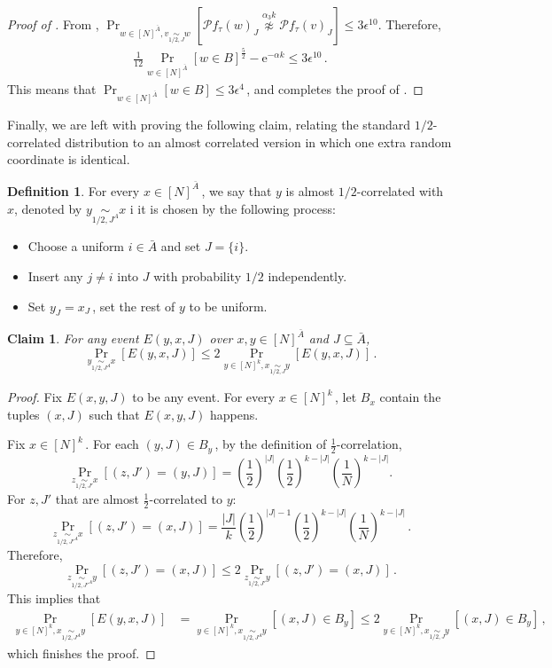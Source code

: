\documentclass[11pt]{article}
\numberwithin{equation}{section}
\newtheorem{claim}[theorem]{Claim}
\theoremstyle{definition}
\newtheorem{definition}[theorem]{Definition}
\theoremstyle{plain}
\newcommand{\eee}{\mathrm e}
\newcommand{\Prob}[2][]{\Pr_{{#1}}\left[#2\right]} %
\newcommand{\Paren}[1]{\left(#1\right)} %
\newcommand{\brac}[1]{[#1]} %
\newcommand{\set}[1]{\{#1\}} %
\newcommand\f{f} %
\newcommand\bh{\mathcal{P}\f_\tau} %
\newcommand\neqg[1]{\stackrel{{#1}}{ \not\approx}} %
\newcommand\cor[1]{\underset{\scriptscriptstyle#1}{\sim}} %
\newcommand\acor[1]{\underset{\scriptscriptstyle#1^A}{\sim}} %
\newcommand\rest[1]{{\bar{#1}}}  %
\begin{document}
\begin{proof}[Proof of ]
	From , $\Prob[{w\in\brac{N}^{\bar{A}},v\cor{1/2,J}{w}}]{\bh(w)_J\neqg{\alpha_3 k} \bh(v)_J}\leq 3\epsilon^{10}.$ Therefore,
	\begin{align}\label{eq:upper BC}
		\frac{1}{12}\Pr_{w\in[N]^{\bar{A}}}[w\in B]^\frac{5}{2} - \eee^{-\alpha k} \leq 3\epsilon^{10}\,. %
	\end{align}
	This means that $\Pr_{w\in[N]^{\bar{A}}}[w\in B] \leq 3\epsilon^4$\,,
and completes the proof of .
\end{proof}

Finally, we are left with proving the following claim, relating the standard 
%
%
%
$1/2$-correlated %
distribution to an almost correlated version in which one extra random coordinate is identical.
\begin{definition}
    For every $x\in[N]^{\rest{A}}$\,, we say that $y$ is almost 
%
%
$1/2$-correlated %
with $x$, denoted by $y\acor{1/2,J}x$ i it is chosen by the following process:
    \begin{itemize}
    \item Choose a uniform $i\in\rest{A}$ and set $J=\set{i}$.
    \item Insert any $j\neq i$ into $J$ with probability 
    $1/2$ %
     independently.
    \item Set $y_J = x_J$\,, set the rest of $y$ to be uniform.
    \end{itemize}
\end{definition}
\begin{claim} \label{claim:almost cor sim cor}
	For any event $E(y,x,J)$ over $x,y\in[N]^{\rest{A}}$ and $J\subseteq\rest{A}$,
	\[\Prob[y\acor{1/2,J}x]{E(y,x,J)}\leq 2\Prob[y\in\brac{N}^k,x\cor{1/2,J}{y}]{E(y,x,J)}\,. \]%
\end{claim}

\begin{proof}
	Fix $E(x,y,J)$ to be any event.
	For every $x\in [N]^{k}$\,, let $B_x$ contain the tuples $(x,J)$ such that $E(x,y,J)$ happens.	%
	
	Fix $x\in \brac{N}^k$\,. For each $(y,J)\in B_y$\,, by the definition of $\frac{1}{2}$-correlation,
	\[\Prob[z \cor{1/2,J'}{x}]{(z,J') = (y,J)} = \Paren{\frac{1}{2}}^{|J|}\Paren{\frac{1}{2}}^{k-|J|}\left(\frac{1}{N}\right)^{k-|J|}.\]
For $z,J'$ that are almost 
$\frac{1}{2}$-correlated %
to $y$:
	\[\Prob[z \acor{1/2,J'}{x}]{(z,J') = (x,J)} = \frac{|J|}{k}\Paren{\frac{1}{2}}^{|J| - 1}\Paren{\frac{1}{2}}^{k-|J|}\left(\frac{1}{N}\right)^{k-|J|}\,.\]%
	Therefore,
	\[\Prob[z\acor{1/2,J'}y]{(z,J') = (x,J)}\leq 2\Prob[z \cor{1/2,J'}{y}]{(z,J') = (x,J)}\,.\]%
	This implies that
	\begin{align*}
	\Prob[y\in \brac{N}^k,x \acor{1/2,J}y]{E(y,x,J)} &= \Prob[y\in \brac{N}^k,x \acor{1/2,J}y]{(x,J)\in B_y}\leq 2\Prob[y\in \brac{N}^k,x \cor{1/2,J}{y}]{(x,J)\in B_y}\,,%
	\end{align*}
	which finishes the proof.
\end{proof}
\end{document}
